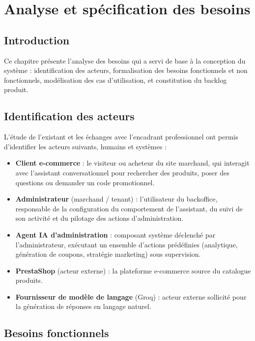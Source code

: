 \chapter{Analyse et spécification des besoins}
\label{chap:analyse}

\section*{Introduction}

Ce chapitre présente l'analyse des besoins qui a servi de base à la conception du système : identification des acteurs, formalisation des besoins fonctionnels et non fonctionnels, modélisation des cas d'utilisation, et constitution du backlog produit.

\section{Identification des acteurs}

L'étude de l'existant et les échanges avec l'encadrant professionnel ont permis d'identifier les acteurs suivants, humains et systèmes :

\begin{itemize}
    \item \textbf{Client e-commerce} : le visiteur ou acheteur du site marchand, qui interagit avec l'assistant conversationnel pour rechercher des produits, poser des questions ou demander un code promotionnel.
    \item \textbf{Administrateur} (marchand / tenant) : l'utilisateur du backoffice, responsable de la configuration du comportement de l'assistant, du suivi de son activité et du pilotage des actions d'administration.
    \item \textbf{Agent IA d'administration} : composant système déclenché par l'administrateur, exécutant un ensemble d'actions prédéfinies (analytique, génération de coupons, stratégie marketing) sous supervision.
    \item \textbf{PrestaShop} (acteur externe) : la plateforme e-commerce source du catalogue produits.
    \item \textbf{Fournisseur de modèle de langage} (Groq) : acteur externe sollicité pour la génération de réponses en langage naturel.
\end{itemize}

\section{Besoins fonctionnels}

